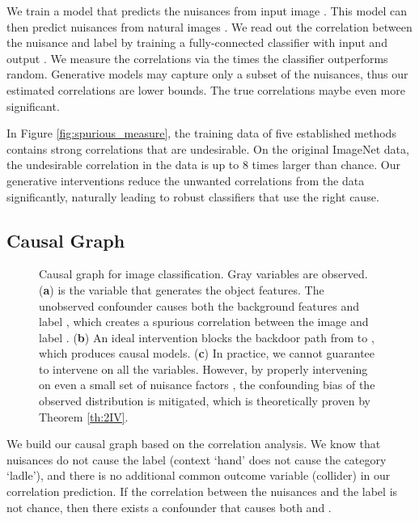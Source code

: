\documentclass[final]{cvpr}
\begin{document}
We train a model that predicts the nuisances  from input image . This model can then predict nuisances  from natural images . We read out the correlation between the nuisance  and label  by training a fully-connected classifier with input  and output . We measure the correlations via the times the classifier outperforms random. Generative models may capture only a subset of the nuisances, thus our estimated correlations are lower bounds. The true correlations maybe even more significant.

In Figure \ref{fig:spurious_measure}, the training data of five established methods \cite{He_2016, zhang2017mixup, cubuk2018autoaugment, imagenetbiased, CAS} contains strong correlations that are undesirable. On the original ImageNet data, the undesirable correlation in the data is up to 8 times larger than chance. Our generative interventions reduce the unwanted correlations from the data significantly, naturally leading to robust classifiers that use the right cause.



\subsection{Causal Graph}

 \begin{figure}[t]
\centering
\vspace{-1mm}
\caption{Causal graph for image classification. Gray variables are observed. (\textbf{a})  is the variable that generates the object features. The unobserved confounder  causes both the  background features  and label , which creates a spurious correlation between the image  and label . (\textbf{b}) An ideal intervention blocks the backdoor path from  to , which produces causal models. (\textbf{c}) In practice, we cannot guarantee to intervene on all the  variables. However, by properly intervening on even a small set of nuisance factors , the confounding bias of the observed distribution is mitigated, which is theoretically proven by Theorem \ref{th:2IV}.}
  \label{fig:causalgraph}
  \vspace{-5mm}
\end{figure}
We build our causal graph based on the correlation analysis. We know that nuisances do not cause the label (context `hand' does not cause the category `ladle'), and there is no additional common outcome variable (collider) in our correlation prediction. If the correlation between the nuisances and the label is not chance, then there exists a confounder  that causes both  and .
\end{document}
